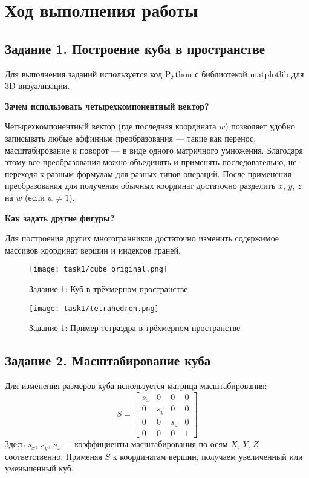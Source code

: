 
\chapter{Ход выполнения работы}

\section{Задание 1. Построение куба в пространстве}

Для выполнения заданий используется код Python с библиотекой matplotlib для 3D визуализации.

\textbf{Зачем использовать четырехкомпонентный вектор?}

Четырехкомпонентный вектор (где последняя координата $w$) позволяет удобно записывать любые аффинные преобразования — такие как перенос, масштабирование и поворот — в виде одного матричного умножения. Благодаря этому все преобразования можно объединять и применять последовательно, не переходя к разным формулам для разных типов операций. После применения преобразования для получения обычных координат достаточно разделить $x$, $y$, $z$ на $w$ (если $w \neq 1$).

\textbf{Как задать другие фигуры?}

Для построения других многогранников достаточно изменить содержимое массивов координат вершин и индексов граней.

\begin{figure}[h!]
    \centering
    \texttt{[image: task1/cube\_original.png]}
    \caption{Задание 1: Куб в трёхмерном пространстве}
\end{figure}

\begin{figure}[h!]
    \centering
    \texttt{[image: task1/tetrahedron.png]}
    \caption{Задание 1: Пример тетраэдра в трёхмерном пространстве}
\end{figure}

\section{Задание 2. Масштабирование куба}

Для изменения размеров куба используется матрица масштабирования:
\[
S = \begin{bmatrix}
    s_x & 0 & 0 & 0 \\
    0 & s_y & 0 & 0 \\
    0 & 0 & s_z & 0 \\
    0 & 0 & 0 & 1
\end{bmatrix}
\]
Здесь $s_x$, $s_y$, $s_z$ --- коэффициенты масштабирования по осям $X$, $Y$, $Z$ соответственно. Применяя $S$ к координатам вершин, получаем увеличенный или уменьшенный куб.

